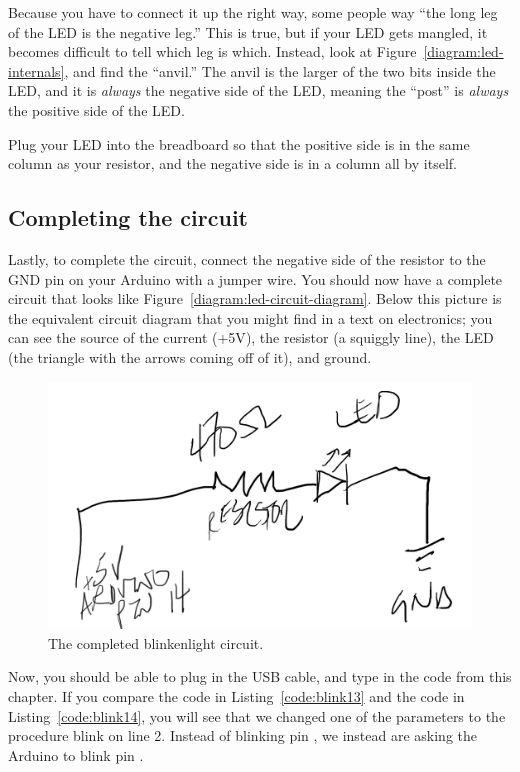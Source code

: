 Because you have to connect it up the right way, some people way ``the long leg of the LED is the negative leg.'' This is true, but if your LED gets mangled, it becomes difficult to tell which leg is which. Instead, look at Figure~\vref{diagram:led-internals}, and find the ``anvil.'' The anvil is the larger of the two bits inside the LED, and it is {\em always} the negative side of the LED, meaning the ``post'' is {\em always} the positive side of the LED.

Plug your LED into the breadboard so that the positive side is in the same column as your resistor, and the negative side is in a column all by itself.

\subsection{Completing the circuit}
Lastly, to complete the circuit, connect the negative side of the resistor to the {\code GND} pin on your Arduino with a jumper wire. You should now have a complete circuit that looks like Figure~\vref{diagram:led-circuit-diagram}. Below this picture is the equivalent circuit diagram that you might find in a text on electronics; you can see the source of the current ({\code +5V}), the resistor (a squiggly line), the LED (the triangle with the arrows coming off of it), and ground. 

\begin{figure}[ht]
  \begin{center}
    \includegraphics[width=0.8\linewidth]{images/led-circuit-diagram}
    \caption{The completed blinkenlight circuit.}
    \label{diagram:led-circuit-diagram}
  \end{center}
\end{figure}

Now, you should be able to plug in the USB cable, and type in the code from this chapter. If you compare the code in Listing~\vref{code:blink13} and the code in Listing~\vref{code:blink14}, you will see that we changed  one of the parameters to the procedure {\procname blink} on line 2. Instead of blinking pin {}, we instead are asking the Arduino to blink pin {}.

